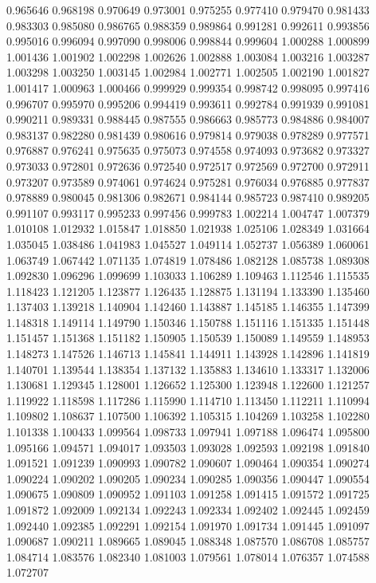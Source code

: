 0.965646
0.968198
0.970649
0.973001
0.975255
0.977410
0.979470
0.981433
0.983303
0.985080
0.986765
0.988359
0.989864
0.991281
0.992611
0.993856
0.995016
0.996094
0.997090
0.998006
0.998844
0.999604
1.000288
1.000899
1.001436
1.001902
1.002298
1.002626
1.002888
1.003084
1.003216
1.003287
1.003298
1.003250
1.003145
1.002984
1.002771
1.002505
1.002190
1.001827
1.001417
1.000963
1.000466
0.999929
0.999354
0.998742
0.998095
0.997416
0.996707
0.995970
0.995206
0.994419
0.993611
0.992784
0.991939
0.991081
0.990211
0.989331
0.988445
0.987555
0.986663
0.985773
0.984886
0.984007
0.983137
0.982280
0.981439
0.980616
0.979814
0.979038
0.978289
0.977571
0.976887
0.976241
0.975635
0.975073
0.974558
0.974093
0.973682
0.973327
0.973033
0.972801
0.972636
0.972540
0.972517
0.972569
0.972700
0.972911
0.973207
0.973589
0.974061
0.974624
0.975281
0.976034
0.976885
0.977837
0.978889
0.980045
0.981306
0.982671
0.984144
0.985723
0.987410
0.989205
0.991107
0.993117
0.995233
0.997456
0.999783
1.002214
1.004747
1.007379
1.010108
1.012932
1.015847
1.018850
1.021938
1.025106
1.028349
1.031664
1.035045
1.038486
1.041983
1.045527
1.049114
1.052737
1.056389
1.060061
1.063749
1.067442
1.071135
1.074819
1.078486
1.082128
1.085738
1.089308
1.092830
1.096296
1.099699
1.103033
1.106289
1.109463
1.112546
1.115535
1.118423
1.121205
1.123877
1.126435
1.128875
1.131194
1.133390
1.135460
1.137403
1.139218
1.140904
1.142460
1.143887
1.145185
1.146355
1.147399
1.148318
1.149114
1.149790
1.150346
1.150788
1.151116
1.151335
1.151448
1.151457
1.151368
1.151182
1.150905
1.150539
1.150089
1.149559
1.148953
1.148273
1.147526
1.146713
1.145841
1.144911
1.143928
1.142896
1.141819
1.140701
1.139544
1.138354
1.137132
1.135883
1.134610
1.133317
1.132006
1.130681
1.129345
1.128001
1.126652
1.125300
1.123948
1.122600
1.121257
1.119922
1.118598
1.117286
1.115990
1.114710
1.113450
1.112211
1.110994
1.109802
1.108637
1.107500
1.106392
1.105315
1.104269
1.103258
1.102280
1.101338
1.100433
1.099564
1.098733
1.097941
1.097188
1.096474
1.095800
1.095166
1.094571
1.094017
1.093503
1.093028
1.092593
1.092198
1.091840
1.091521
1.091239
1.090993
1.090782
1.090607
1.090464
1.090354
1.090274
1.090224
1.090202
1.090205
1.090234
1.090285
1.090356
1.090447
1.090554
1.090675
1.090809
1.090952
1.091103
1.091258
1.091415
1.091572
1.091725
1.091872
1.092009
1.092134
1.092243
1.092334
1.092402
1.092445
1.092459
1.092440
1.092385
1.092291
1.092154
1.091970
1.091734
1.091445
1.091097
1.090687
1.090211
1.089665
1.089045
1.088348
1.087570
1.086708
1.085757
1.084714
1.083576
1.082340
1.081003
1.079561
1.078014
1.076357
1.074588
1.072707
